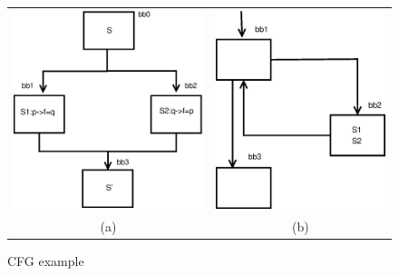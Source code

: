 \begin{figure}[h]
\begin{tabular}{cc}
\includegraphics[scale=.4]{diagrams/Enhancements_d1.eps} & \includegraphics[scale=.4]{diagrams/Enhancements_d2.eps} \\
\footnotesize (a) & \footnotesize (b) 
\end{tabular}
\caption{CFG example}\label{CFG_1}
\end{figure}    


